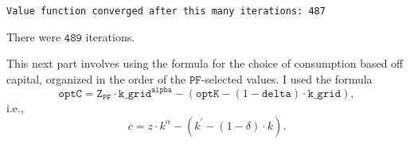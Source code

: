 \documentclass[11pt]{article}
\begin{document}
    \begin{Verbatim}[commandchars=\\\{\}]
Value function converged after this many iterations: 487

    \end{Verbatim}

    There were \(\mathtt{489}\) iterations.

    This next part involves using the formula for the choice of consumption
based off capital, organized in the order of the
\(\mathtt{PF}\)-selected values. I used the formula \[
\mathtt{optC} = \mathtt{Z}_{\mathtt{PF}} \cdot \mathtt{k}\_\mathtt{grid} ^ \mathtt{alpha} - \left( \mathtt{optK} - (1-\mathtt{delta}) \cdot \mathtt{k}\_\mathtt{grid} \right),
\] i.e., \[
c=z\cdot k^\alpha - (k^{\prime} - (1-\delta)\cdot k).
\]
\end{document}

